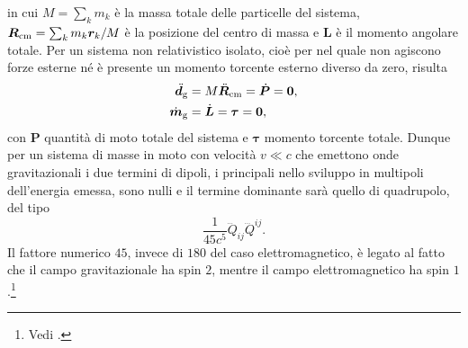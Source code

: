in cui $M = \sum_{k} m_{k}$ è la massa totale delle particelle del sistema,
$\bm{R}_{\textup{cm}} = \sum_{k} m_{k} \bm{r}_{k}/M$ è la posizione del centro
di massa e $\bm{L}$ è il momento angolare totale.  Per un sistema non
relativistico isolato, cioè per nel quale non agiscono forze esterne né è
presente un momento torcente esterno diverso da zero, risulta
\begin{subequations}
  \begin{align}
    \ddot{\bm{d}}_{\textup{g}} &= M \ddot{\bm{R}}_{\textup{cm}} =
    \dot{\bm{P}} = \bm{0}, \\
    \dot{\bm{m}}_{\textup{g}} &= \dot{\bm{L}} = \bm{\tau} = \bm{0},
  \end{align}
\end{subequations}
con $\bm{P}$ quantità di moto totale del sistema e $\bm{\tau}$ momento torcente
totale.  Dunque per un sistema di masse in moto con velocità $v \ll c$ che
emettono onde gravitazionali i due termini di dipoli, i principali nello
sviluppo in multipoli dell'energia emessa, sono nulli e il termine dominante
sarà quello di quadrupolo, del tipo
\begin{equation}
  \frac{1}{45c^{5}}\dddot{Q}_{ij}\dddot{Q}^{ij}.
\end{equation}
Il fattore numerico $45$, invece di $180$ del caso elettromagnetico, è legato al
fatto che il campo gravitazionale ha spin $2$, mentre il campo elettromagnetico
ha spin $1$.\footnote{Vedi \textcite[471]{shapiro:black-holes}.}

